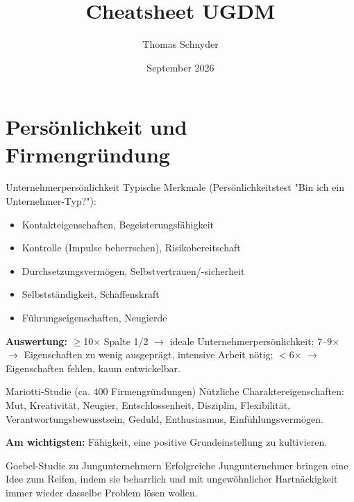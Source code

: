 \documentclass[a4paper, fontsize=7pt]{scrartcl}
\title{Cheatsheet UGDM}
\author{Thomas Schnyder}
\date{September 2026}
\begin{document}
\maketitle

\section{Persönlichkeit und Firmengründung}

\begin{mainbox}{Unternehmerpersönlichkeit}
Typische Merkmale (Persönlichkeitstest "Bin ich ein Unternehmer-Typ?"):
\begin{itemize}
    \item Kontakteigenschaften, Begeisterungsfähigkeit
    \item Kontrolle (Impulse beherrschen), Risikobereitschaft
    \item Durchsetzungsvermögen, Selbstvertrauen/-sicherheit
    \item Selbstständigkeit, Schaffenskraft
    \item Führungseigenschaften, Neugierde
\end{itemize}
\textbf{Auswertung:} $\geq$10$\times$ Spalte 1/2 $\to$ ideale Unternehmerpersönlichkeit;
7--9$\times$ $\to$ Eigenschaften zu wenig ausgeprägt, intensive Arbeit nötig;
$<$6$\times$ $\to$ Eigenschaften fehlen, kaum entwickelbar.
\end{mainbox}

\begin{subbox}{Mariotti-Studie (ca. 400 Firmengründungen)}
Nützliche Charaktereigenschaften: Mut, Kreativität, Neugier, Entschlossenheit,
Disziplin, Flexibilität, Verantwortungsbewusstsein, Geduld, Enthusiasmus,
Einfühlungsvermögen.

\textbf{Am wichtigsten:} Fähigkeit, eine positive Grundeinstellung zu kultivieren.
\end{subbox}

\begin{subbox}{Goebel-Studie zu Jungunternehmern}
Erfolgreiche Jungunternehmer bringen eine Idee zum Reifen, indem sie beharrlich
und mit ungewöhnlicher Hartnäckigkeit immer wieder dasselbe Problem lösen wollen.
\end{subbox}

\end{document}
